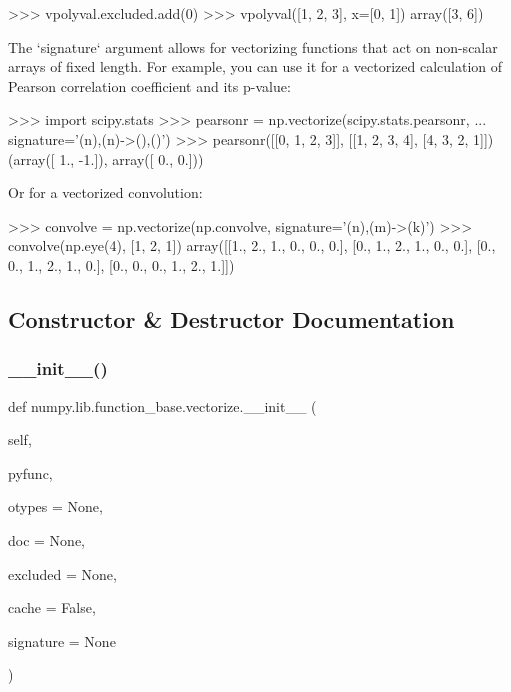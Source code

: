 \begin{DoxyVerb}
>>> vpolyval.excluded.add(0)
>>> vpolyval([1, 2, 3], x=[0, 1])
array([3, 6])

The `signature` argument allows for vectorizing functions that act on
non-scalar arrays of fixed length. For example, you can use it for a
vectorized calculation of Pearson correlation coefficient and its p-value:

>>> import scipy.stats
>>> pearsonr = np.vectorize(scipy.stats.pearsonr,
...                 signature='(n),(n)->(),()')
>>> pearsonr([[0, 1, 2, 3]], [[1, 2, 3, 4], [4, 3, 2, 1]])
(array([ 1., -1.]), array([ 0.,  0.]))

Or for a vectorized convolution:

>>> convolve = np.vectorize(np.convolve, signature='(n),(m)->(k)')
>>> convolve(np.eye(4), [1, 2, 1])
array([[1., 2., 1., 0., 0., 0.],
       [0., 1., 2., 1., 0., 0.],
       [0., 0., 1., 2., 1., 0.],
       [0., 0., 0., 1., 2., 1.]])\end{DoxyVerb}
 

\subsection{Constructor \& Destructor Documentation}
\mbox{\label{classnumpy_1_1lib_1_1function__base_1_1vectorize_aa40dfbdda34cdfa88f36c391a855e570}} 
\subsubsection{\texorpdfstring{\+\_\+\+\_\+init\+\_\+\+\_\+()}{\_\_init\_\_()}}
{\footnotesize\ttfamily def numpy.\+lib.\+function\+\_\+base.\+vectorize.\+\_\+\+\_\+init\+\_\+\+\_\+ (\begin{DoxyParamCaption}\item[{}]{self,  }\item[{}]{pyfunc,  }\item[{}]{otypes = {\ttfamily None},  }\item[{}]{doc = {\ttfamily None},  }\item[{}]{excluded = {\ttfamily None},  }\item[{}]{cache = {\ttfamily False},  }\item[{}]{signature = {\ttfamily None} }\end{DoxyParamCaption})}



